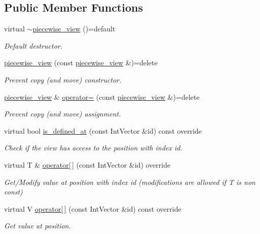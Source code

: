 \subsection*{Public Member Functions}
\begin{DoxyCompactItemize}
\item 
virtual \hyperlink{classUintah_1_1PhaseField_1_1detail_1_1piecewise__view_3_01ScalarField_3_01T_01_4_01_4_a27dda4b757d27bc2071ba1c850386b9f}{$\sim$piecewise\+\_\+view} ()=default
\begin{DoxyCompactList}\small\item\em Default destructor. \end{DoxyCompactList}\item 
\hyperlink{classUintah_1_1PhaseField_1_1detail_1_1piecewise__view_3_01ScalarField_3_01T_01_4_01_4_ae009d9a76c018a8056210f9ffa83582b}{piecewise\+\_\+view} (const \hyperlink{classUintah_1_1PhaseField_1_1detail_1_1piecewise__view}{piecewise\+\_\+view} \&)=delete
\begin{DoxyCompactList}\small\item\em Prevent copy (and move) constructor. \end{DoxyCompactList}\item 
\hyperlink{classUintah_1_1PhaseField_1_1detail_1_1piecewise__view}{piecewise\+\_\+view} \& \hyperlink{classUintah_1_1PhaseField_1_1detail_1_1piecewise__view_3_01ScalarField_3_01T_01_4_01_4_a719400ade1a6a5dff7d16ac29c70e2f0}{operator=} (const \hyperlink{classUintah_1_1PhaseField_1_1detail_1_1piecewise__view}{piecewise\+\_\+view} \&)=delete
\begin{DoxyCompactList}\small\item\em Prevent copy (and move) assignment. \end{DoxyCompactList}\item 
virtual bool \hyperlink{classUintah_1_1PhaseField_1_1detail_1_1piecewise__view_3_01ScalarField_3_01T_01_4_01_4_a6fd5f9ee9b2e91f114845fa2ada152e0}{is\+\_\+defined\+\_\+at} (const Int\+Vector \&id) const override
\begin{DoxyCompactList}\small\item\em Check if the view has access to the position with index id. \end{DoxyCompactList}\item 
virtual T \& \hyperlink{classUintah_1_1PhaseField_1_1detail_1_1piecewise__view_3_01ScalarField_3_01T_01_4_01_4_afd5e93d57629abd12be24b48138f560b}{operator\mbox{[}$\,$\mbox{]}} (const Int\+Vector \&id) override
\begin{DoxyCompactList}\small\item\em Get/\+Modify value at position with index id (modifications are allowed if T is non const) \end{DoxyCompactList}\item 
virtual V \hyperlink{classUintah_1_1PhaseField_1_1detail_1_1piecewise__view_3_01ScalarField_3_01T_01_4_01_4_af7d5e07b63df16d901919eb639b1f177}{operator\mbox{[}$\,$\mbox{]}} (const Int\+Vector \&id) const override
\begin{DoxyCompactList}\small\item\em Get value at position. \end{DoxyCompactList}\end{DoxyCompactItemize}
